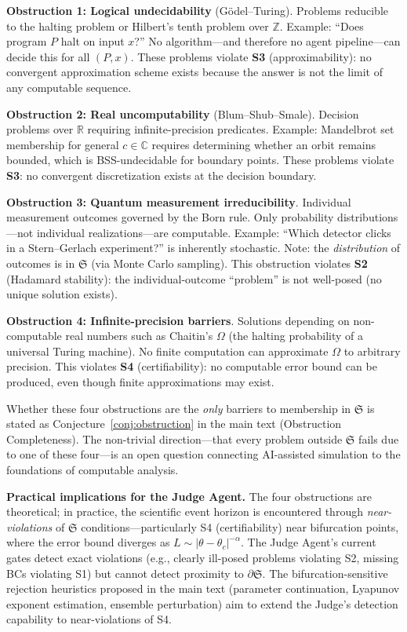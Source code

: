 \documentclass[11pt,a4paper]{article}
\newcommand{\R}{\mathbb{R}}
\newcommand{\Sclass}{\mathfrak{S}}
\newcommand{\Z}{\mathbb{Z}}
\begin{document}
\textbf{Obstruction 1: Logical undecidability} (G\"odel--Turing). Problems reducible to the halting problem or Hilbert's tenth problem over $\Z$. Example: ``Does program $P$ halt on input $x$?'' No algorithm---and therefore no agent pipeline---can decide this for all $(P, x)$. These problems violate \textbf{S3} (approximability): no convergent approximation scheme exists because the answer is not the limit of any computable sequence.

\textbf{Obstruction 2: Real uncomputability} (Blum--Shub--Smale). Decision problems over $\R$ requiring infinite-precision predicates. Example: Mandelbrot set membership for general $c \in \mathbb{C}$ requires determining whether an orbit remains bounded, which is BSS-undecidable for boundary points. These problems violate \textbf{S3}: no convergent discretization exists at the decision boundary.

\textbf{Obstruction 3: Quantum measurement irreducibility}. Individual measurement outcomes governed by the Born rule. Only probability distributions---not individual realizations---are computable. Example: ``Which detector clicks in a Stern--Gerlach experiment?'' is inherently stochastic. Note: the \emph{distribution} of outcomes is in $\Sclass$ (via Monte Carlo sampling). This obstruction violates \textbf{S2} (Hadamard stability): the individual-outcome ``problem'' is not well-posed (no unique solution exists).

\textbf{Obstruction 4: Infinite-precision barriers}. Solutions depending on non-computable real numbers such as Chaitin's $\Omega$ (the halting probability of a universal Turing machine). No finite computation can approximate $\Omega$ to arbitrary precision. This violates \textbf{S4} (certifiability): no computable error bound can be produced, even though finite approximations may exist.

Whether these four obstructions are the \emph{only} barriers to membership in $\Sclass$ is stated as Conjecture~\ref{conj:obstruction} in the main text (Obstruction Completeness). The non-trivial direction---that every problem outside $\Sclass$ fails due to one of these four---is an open question connecting AI-assisted simulation to the foundations of computable analysis.

\textbf{Practical implications for the Judge Agent.} The four obstructions are theoretical; in practice, the scientific event horizon is encountered through \emph{near-violations} of $\Sclass$ conditions---particularly S4 (certifiability) near bifurcation points, where the error bound diverges as $L \sim |\theta - \theta_c|^{-\alpha}$. The Judge Agent's current gates detect exact violations (e.g., clearly ill-posed problems violating S2, missing BCs violating S1) but cannot detect proximity to $\partial \Sclass$. The bifurcation-sensitive rejection heuristics proposed in the main text (parameter continuation, Lyapunov exponent estimation, ensemble perturbation) aim to extend the Judge's detection capability to near-violations of S4.
\end{document}
